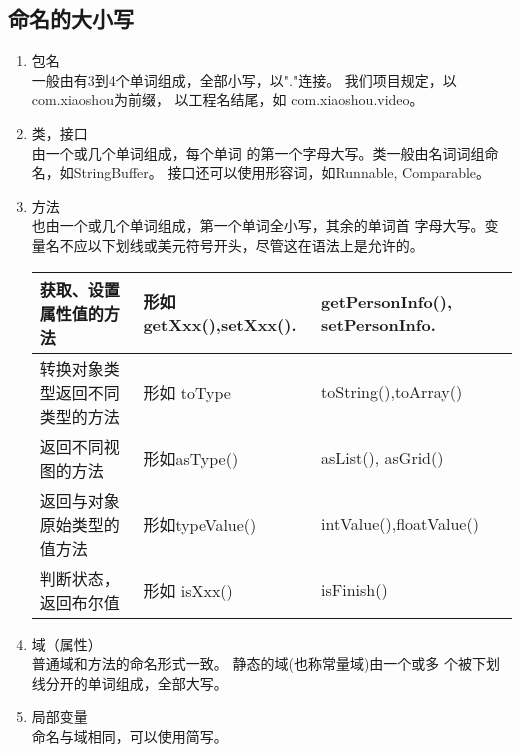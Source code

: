 \documentclass[a4paper,12pt]{article}
\makeatletter
\newcommand{\tabcaption}{\def\@captype{table}\caption}
\makeatother
\begin{document}
\subsection{命名的大小写}
\begin{enumerate}
    \item 包名 \hfill\\一般由有3到4个单词组成，全部小写，以"."连接。
        我们项目规定，以com.xiaoshou为前缀，
        以工程名结尾，如 com.xiaoshou.video。
    \item 类，接口 \hfill\\ 由一个或几个单词组成，每个单词
        的第一个字母大写。类一般由名词词组命名，如StringBuffer。
        接口还可以使用形容词，如Runnable, Comparable。
    \item 方法 \hfill\\ 也由一个或几个单词组成，第一个单词全小写，其余的单词首
        字母大写。变量名不应以下划线或美元符号开头，尽管这在语法上是允许的。
        \tabcaption{ 方法命名的一些规则 }
        \begin{tabular}{p{}p{}p{}}\hline
           获取、设置属性值的方法 &形如getXxx(),\newline setXxx(). &
           getPersonInfo(), \newline setPersonInfo.\\\hline
           转换对象类型返回不同类型的方法 &形如 toType &
           toString(),\newline toArray()\\\hline
           返回不同视图的方法 & 形如asType()  & 
           asList(), \newline asGrid()\\\hline
           返回与对象原始类型的值方法 & 形如typeValue() & 
           intValue(),\newline floatValue() \\\hline
           判断状态，返回布尔值 & 形如 isXxx() & isFinish()\\\hline
        \end{tabular}
    \item 域（属性） \hfill\\
        普通域和方法的命名形式一致。 静态的域(也称常量域)由一个或多
        个被下划线分开的单词组成，全部大写。
    \item 局部变量\hfill\\
        命名与域相同，可以使用简写。
\end{enumerate}
\end{document}
